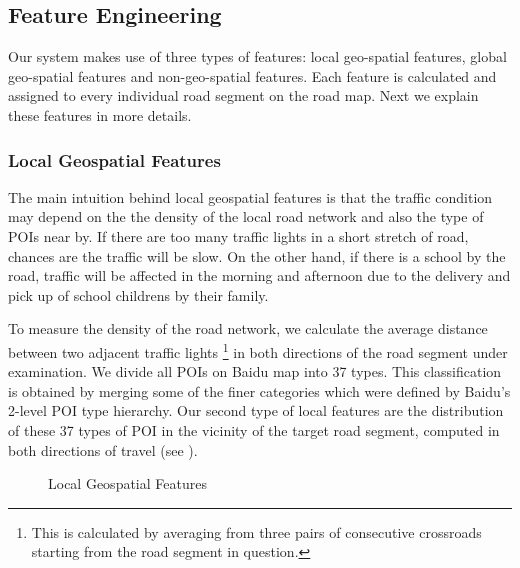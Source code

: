 \subsection{Feature Engineering}
\label{sec:feature}
Our system makes use of three types of features: local geo-spatial
features, global geo-spatial features and non-geo-spatial features.
Each feature is calculated and assigned to every individual road segment
on the road map. Next we explain these features in more details.

\subsubsection{Local Geospatial Features}
The main intuition behind local geospatial features is that the traffic 
condition may depend on the the density of the local road network and also
the type of POIs near by. If there are too many traffic lights in a short stretch
of road, chances are the traffic will be slow. On the other hand, if there is a
school by the road, traffic will be affected in the morning and afternoon due to
the delivery and pick up of school childrens by their family. 

To measure the density of the road network, 
we calculate the average distance between two adjacent traffic lights \footnote{This is calculated by averaging from three pairs of consecutive crossroads
starting from the road segment in question.} in
both directions of the road segment under examination.
We divide all POIs on Baidu map into 37 types.
This classification is obtained by merging some of the finer categories which
were defined by Baidu's 2-level POI type hierarchy. Our second type of local 
features are the distribution of these 37 types of POI in the vicinity of the
target road segment, computed in both directions of travel 
(see ). 

\begin{figure}[th]
	\centering
	\caption{Local Geospatial Features}
	\label{fig:poifeature}
\end{figure}



